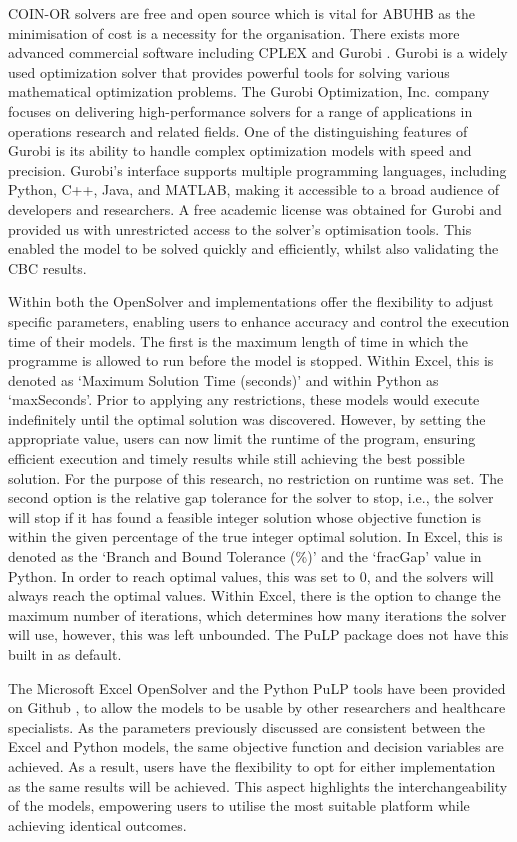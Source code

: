 \documentclass[../thesis.tex]{subfiles}
\begin{document}
COIN-OR solvers are free and open source which is vital for ABUHB as the minimisation of cost is a necessity for the organisation. There exists more advanced commercial software including CPLEX \cite{IBM} and Gurobi \cite{GurobiOptimization}. Gurobi is a widely used optimization solver that provides powerful tools for solving various mathematical optimization problems. The Gurobi Optimization, Inc. company focuses on delivering high-performance solvers for a range of applications in operations research and related fields. One of the distinguishing features of Gurobi is its ability to handle complex optimization models with speed and precision. Gurobi's interface supports multiple programming languages, including Python, C++, Java, and MATLAB, making it accessible to a broad audience of developers and researchers. A free academic license was obtained for Gurobi and provided us with unrestricted access to the solver's optimisation tools. This enabled the model to be solved quickly and efficiently, whilst also validating the CBC results.

Within both the OpenSolver and implementations offer the flexibility to adjust specific parameters, enabling users to enhance accuracy and control the execution time of their models. The first is the maximum length of time in which the programme is allowed to run before the model is stopped. Within Excel, this is denoted as `Maximum Solution Time (seconds)' and within Python as `maxSeconds'. Prior to applying any restrictions, these models would execute indefinitely until the optimal solution was discovered. However, by setting the appropriate value, users can now limit the runtime of the program, ensuring efficient execution and timely results while still achieving the best possible solution. For the purpose of this research, no restriction on runtime was set. The second option is the relative gap tolerance for the solver to stop, i.e., the solver will stop if it has found a feasible integer solution whose objective function is within the given percentage of the true integer optimal solution. In Excel, this is denoted as the `Branch and Bound Tolerance (\%)' and the `fracGap' value in Python. In order to reach optimal values, this was set to 0, and the solvers will always reach the optimal values. Within Excel, there is the option to change the maximum number of iterations, which determines how many iterations the solver will use, however, this was left unbounded. The PuLP package does not have this built in as default.

The Microsoft Excel OpenSolver and the Python PuLP tools have been provided on Github \cite{Williams2023}, to allow the models to be usable by other researchers and healthcare specialists. As the parameters previously discussed are consistent between the Excel and Python models, the same objective function and decision variables are achieved. As a result, users have the flexibility to opt for either implementation as the same results will be achieved. This aspect highlights the interchangeability of the models, empowering users to utilise the most suitable platform while achieving identical outcomes.
\end{document}

